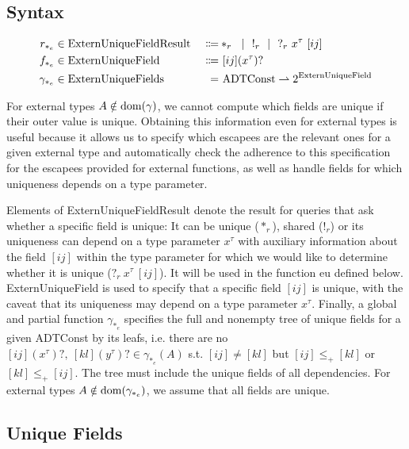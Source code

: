 \newcommand{\ExternUniqueFieldResult}{\mathrm{ExternUniqueFieldResult}}
\newcommand{\ExternUniqueField}{\mathrm{ExternUniqueField}}
\newcommand{\ExternUniqueFields}{\mathrm{ExternUniqueFields}}

\subsection{Syntax}

\begin{alignat*}{3}
	r_{*_e} &\in \ExternUniqueFieldResult\ &\Coloneqq& *_r \sep !_r \sep ?_r\ x^\tau\ [ij] \\
	f_{*_e} &\in \ExternUniqueField\ &\Coloneqq&\ [ij] (x^\tau)? \\
	\gamma_{*_e} &\in \ExternUniqueFields\ &=&\ \ADTConst \rightharpoonup 2^{\ExternUniqueField}
\end{alignat*}

For external types $A \notin \mathrm{dom}(\gamma)$, we cannot compute which fields are unique if their outer value is unique. Obtaining this information even for external types is useful because it allows us to specify which escapees are the relevant ones for a given external type and automatically check the adherence to this specification for the escapees provided for external functions, as well as handle fields for which uniqueness depends on a type parameter.

Elements of ExternUniqueFieldResult denote the result for queries that ask whether a specific field is unique: It can be unique ($*_r$), shared ($!_r$) or its uniqueness can depend on a type parameter $x^\tau$ with auxiliary information about the field $[ij]$ within the type parameter for which we would like to determine whether it is unique ($?_r\ x^\tau\ [ij]$). It will be used in the function eu defined below. ExternUniqueField is used to specify that a specific field $[ij]$ is unique, with the caveat that its uniqueness may depend on a type parameter $x^\tau$. Finally, a global and partial function $\gamma_{*_e}$ specifies the full and nonempty tree of unique fields for a given ADTConst by its leafs, i.e. there are no $[ij] (x^\tau)?,\ [kl] (y^\tau)? \in \gamma_{*_e}(A)$ s.t. $[ij] \neq [kl]$ but $[ij] \leq_+ [kl]$ or $[kl] \leq_+ [ij]$. The tree must include the unique fields of all dependencies. For external types $A \notin \mathrm{dom}(\gamma_{*_e})$, we assume that all fields are unique.

\subsection{Unique Fields}

